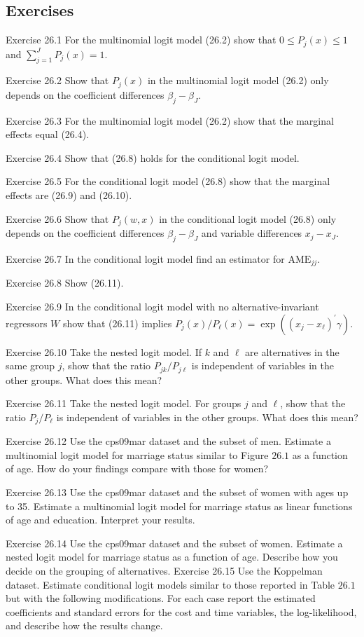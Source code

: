 \documentclass[10pt]{article}
\begin{document}
\subsection{Exercises}
Exercise 26.1 For the multinomial logit model (26.2) show that $0 \leq P_{j}(x) \leq 1$ and $\sum_{j=1}^{J} P_{j}(x)=1$.

Exercise 26.2 Show that $P_{j}(x)$ in the multinomial logit model (26.2) only depends on the coefficient differences $\beta_{j}-\beta_{J}$.

Exercise 26.3 For the multinomial logit model (26.2) show that the marginal effects equal (26.4).

Exercise 26.4 Show that (26.8) holds for the conditional logit model.

Exercise 26.5 For the conditional logit model (26.8) show that the marginal effects are (26.9) and (26.10).

Exercise 26.6 Show that $P_{j}(w, x)$ in the conditional logit model (26.8) only depends on the coefficient differences $\beta_{j}-\beta_{J}$ and variable differences $x_{j}-x_{J}$.

Exercise 26.7 In the conditional logit model find an estimator for $\mathrm{AME}_{j j}$.

Exercise 26.8 Show (26.11).

Exercise 26.9 In the conditional logit model with no alternative-invariant regressors $W$ show that (26.11) implies $P_{j}(x) / P_{\ell}(x)=\exp \left(\left(x_{j}-x_{\ell}\right)^{\prime} \gamma\right)$.

Exercise 26.10 Take the nested logit model. If $k$ and $\ell$ are alternatives in the same group $j$, show that the ratio $P_{j k} / P_{j \ell}$ is independent of variables in the other groups. What does this mean?

Exercise 26.11 Take the nested logit model. For groups $j$ and $\ell$, show that the ratio $P_{j} / P_{\ell}$ is independent of variables in the other groups. What does this mean?

Exercise 26.12 Use the cps09mar dataset and the subset of men. Estimate a multinomial logit model for marriage status similar to Figure $26.1$ as a function of age. How do your findings compare with those for women?

Exercise 26.13 Use the cps09mar dataset and the subset of women with ages up to 35. Estimate a multinomial logit model for marriage status as linear functions of age and education. Interpret your results.

Exercise 26.14 Use the cps09mar dataset and the subset of women. Estimate a nested logit model for marriage status as a function of age. Describe how you decide on the grouping of alternatives. Exercise 26.15 Use the Koppelman dataset. Estimate conditional logit models similar to those reported in Table $26.1$ but with the following modifications. For each case report the estimated coefficients and standard errors for the cost and time variables, the log-likelihood, and describe how the results change.
\end{document}
